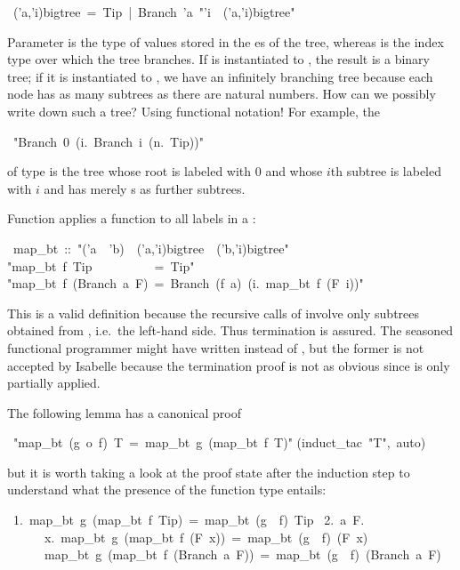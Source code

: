 \begin{isabelle}%
~('a,'i)bigtree~=~Tip~|~Branch~'a~{"}'i~{\isasymRightarrow}~('a,'i)bigtree{"}%
\begin{isamarkuptext}%
\noindent Parameter  is the type of values stored in
the es of the tree, whereas  is the index
type over which the tree branches. If  is instantiated to
, the result is a binary tree; if it is instantiated to
, we have an infinitely branching tree because each node
has as many subtrees as there are natural numbers. How can we possibly
write down such a tree? Using functional notation! For example, the%
\end{isamarkuptext}%
~{"}Branch~0~({\isasymlambda}i.~Branch~i~({\isasymlambda}n.~Tip)){"}%
\begin{isamarkuptext}%
\noindent of type  is the tree whose
root is labeled with 0 and whose $i$th subtree is labeled with $i$ and
has merely s as further subtrees.

Function  applies a function to all labels in a :%
\end{isamarkuptext}%
~map\_bt~::~{"}('a~{\isasymRightarrow}~'b)~{\isasymRightarrow}~('a,'i)bigtree~{\isasymRightarrow}~('b,'i)bigtree{"}\isanewline
{}\isanewline
{"}map\_bt~f~Tip~~~~~~~~~~=~Tip{"}\isanewline
{"}map\_bt~f~(Branch~a~F)~=~Branch~(f~a)~({\isasymlambda}i.~map\_bt~f~(F~i)){"}%
\begin{isamarkuptext}%
\noindent This is a valid  definition because the
recursive calls of  involve only subtrees obtained from
, i.e.\ the left-hand side. Thus termination is assured.  The
seasoned functional programmer might have written  instead
of , but the former is not accepted by
Isabelle because the termination proof is not as obvious since
 is only partially applied.

The following lemma has a canonical proof%
\end{isamarkuptext}%
~{"}map\_bt~(g~o~f)~T~=~map\_bt~g~(map\_bt~f~T){"}\isanewline
{}(induct\_tac~{"}T{"},~auto)%
\begin{isamarkuptext}%
\noindent
but it is worth taking a look at the proof state after the induction step
to understand what the presence of the function type entails:
\begin{isabellepar}%
~1.~map\_bt~g~(map\_bt~f~Tip)~=~map\_bt~(g~{\isasymcirc}~f)~Tip\isanewline
~2.~{\isasymAnd}a~F.\isanewline
~~~~~~{\isasymforall}x.~map\_bt~g~(map\_bt~f~(F~x))~=~map\_bt~(g~{\isasymcirc}~f)~(F~x)~{\isasymLongrightarrow}\isanewline
~~~~~~map\_bt~g~(map\_bt~f~(Branch~a~F))~=~map\_bt~(g~{\isasymcirc}~f)~(Branch~a~F)%
\end{isabellepar}%
\end{isamarkuptext}%
\end{isabelle}%
